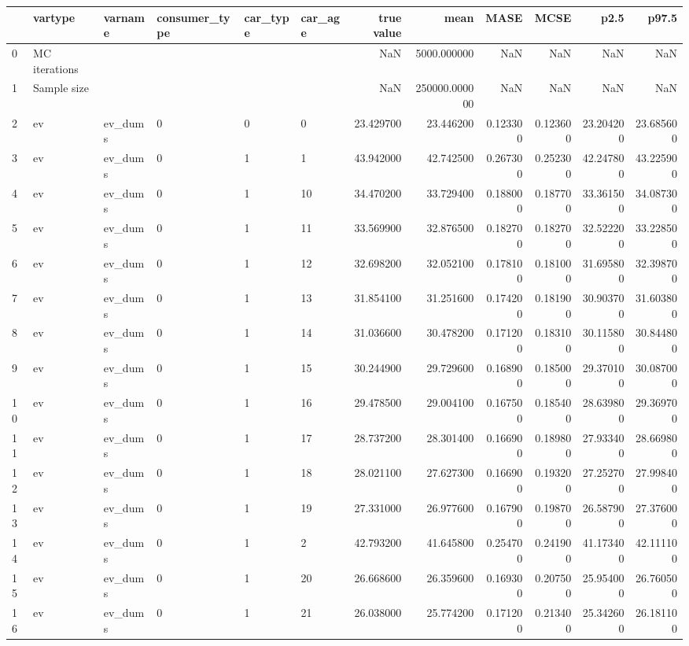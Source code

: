 \begin{tabular}{llllllrrrrrr}
\toprule
 & vartype & varname & consumer_type & car_type & car_age & true value & mean & MASE & MCSE & p2.5 & p97.5 \\
\midrule
0 & MC iterations &  &  &  &  & NaN & 5000.000000 & NaN & NaN & NaN & NaN \\
1 & Sample size &  &  &  &  & NaN & 250000.000000 & NaN & NaN & NaN & NaN \\
2 & ev & ev_dums & 0 & 0 & 0 & 23.429700 & 23.446200 & 0.123300 & 0.123600 & 23.204200 & 23.685600 \\
3 & ev & ev_dums & 0 & 1 & 1 & 43.942000 & 42.742500 & 0.267300 & 0.252300 & 42.247800 & 43.225900 \\
4 & ev & ev_dums & 0 & 1 & 10 & 34.470200 & 33.729400 & 0.188000 & 0.187700 & 33.361500 & 34.087300 \\
5 & ev & ev_dums & 0 & 1 & 11 & 33.569900 & 32.876500 & 0.182700 & 0.182700 & 32.522200 & 33.228500 \\
6 & ev & ev_dums & 0 & 1 & 12 & 32.698200 & 32.052100 & 0.178100 & 0.181000 & 31.695800 & 32.398700 \\
7 & ev & ev_dums & 0 & 1 & 13 & 31.854100 & 31.251600 & 0.174200 & 0.181900 & 30.903700 & 31.603800 \\
8 & ev & ev_dums & 0 & 1 & 14 & 31.036600 & 30.478200 & 0.171200 & 0.183100 & 30.115800 & 30.844800 \\
9 & ev & ev_dums & 0 & 1 & 15 & 30.244900 & 29.729600 & 0.168900 & 0.185000 & 29.370100 & 30.087000 \\
10 & ev & ev_dums & 0 & 1 & 16 & 29.478500 & 29.004100 & 0.167500 & 0.185400 & 28.639800 & 29.369700 \\
11 & ev & ev_dums & 0 & 1 & 17 & 28.737200 & 28.301400 & 0.166900 & 0.189800 & 27.933400 & 28.669800 \\
12 & ev & ev_dums & 0 & 1 & 18 & 28.021100 & 27.627300 & 0.166900 & 0.193200 & 27.252700 & 27.998400 \\
13 & ev & ev_dums & 0 & 1 & 19 & 27.331000 & 26.977600 & 0.167900 & 0.198700 & 26.587900 & 27.376000 \\
14 & ev & ev_dums & 0 & 1 & 2 & 42.793200 & 41.645800 & 0.254700 & 0.241900 & 41.173400 & 42.111100 \\
15 & ev & ev_dums & 0 & 1 & 20 & 26.668600 & 26.359600 & 0.169300 & 0.207500 & 25.954000 & 26.760500 \\
16 & ev & ev_dums & 0 & 1 & 21 & 26.038000 & 25.774200 & 0.171200 & 0.213400 & 25.342600 & 26.181100 \\

\end{tabular}
